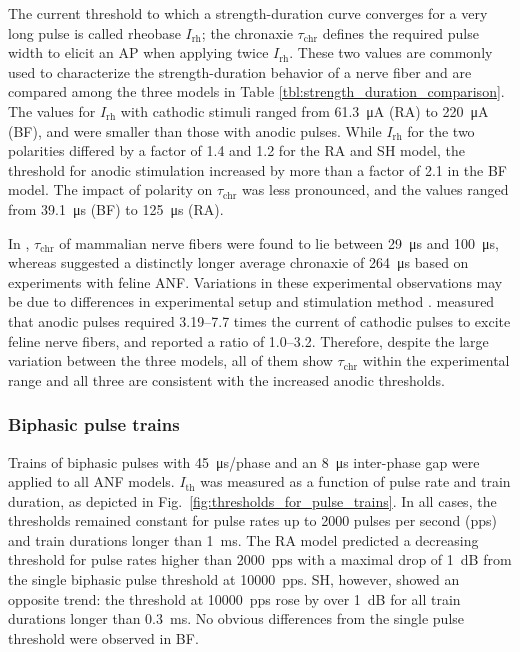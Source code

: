 \documentclass[utf8]{frontiersSCNS} %
\newcommand{\T}[1]{\text{#1}}
\begin{document}
The current threshold to which a strength-duration curve converges for a very long pulse is called rheobase $I_{\T{rh}}$; the chronaxie $\tau_{\T{chr}}$ defines the required pulse width to elicit an AP when applying twice $I_{\T{rh}}$. These two values are commonly used to characterize the strength-duration behavior of a nerve fiber and are compared among the three models in Table \ref{tbl:strength_duration_comparison}. The values for $I_{\T{rh}}$ with cathodic stimuli ranged from \SI{61.3}{\micro\ampere} (RA) to \SI{220}{\micro\ampere} (BF), and were smaller than those with anodic pulses. While  $I_{\T{rh}}$ for the two polarities differed by a factor of 1.4 and 1.2 for the RA and SH model, the threshold for anodic stimulation increased by more than a factor of 2.1 in the BF model. The impact of polarity on $\tau_{\T{chr}}$ was less pronounced, and the values ranged from \SI{39.1}{\micro\second} (BF) to \SI{125}{\micro\second} (RA).

In \cite{Ranck1975}, $\tau_{\T{chr}}$ of  mammalian nerve fibers were found to lie between \SI{29}{\micro\second} and \SI{100}{\micro\second}, whereas \cite{VandenHonert1984} suggested a distinctly longer average chronaxie of \SI{264}{\micro\second} based on experiments with feline ANF. Variations in these experimental observations may be due to differences in experimental setup and stimulation method \citep{Frijns1994}. \cite{BeMent1969} measured that anodic pulses required 3.19--7.7 times the current of cathodic pulses to excite feline nerve fibers, and \cite{Armstrong1973} reported a ratio of 1.0--3.2. Therefore, despite the large variation between the three models, all of them show $\tau_{\T{chr}}$  within the experimental range and all three are consistent with the increased anodic thresholds.

\subsubsection{Biphasic pulse trains}
\label{subsubsec:pulse_trains}
Trains of biphasic pulses with \SI{45}{\micro\second}/phase and an \SI{8}{\micro\second} inter-phase gap were applied to all ANF models. $I_{\T{th}}$ was measured as a function of pulse rate and train duration, as depicted in Fig.\ \ref{fig:thresholds_for_pulse_trains}.
In all cases, the thresholds remained constant for pulse rates up to 2000 pulses per second (pps) and train durations longer than \SI{1}{\milli\second}. The RA model predicted a decreasing threshold for pulse rates higher than \SI{2000}{pps} with a maximal drop of \SI{1}{dB} from the single biphasic pulse threshold at \SI{10000}{pps}. SH, however, showed an opposite trend: the threshold at \SI{10000}{pps} rose by over \SI{1}{dB} for all train durations longer than \SI{0.3}{\milli\second}. No obvious differences from the single pulse threshold were observed in BF.
\end{document}
